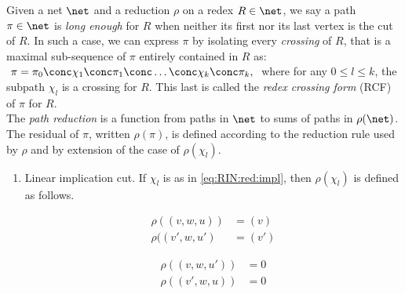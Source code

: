 \begin{definition}
\label{def:RIN:path-red}
Given a net $\net$ and a reduction $\rho$ on a redex $R \in \net$,
we say a path $\pi \in \net$ is \textit{long enough} for $R$ when neither its 
first nor its last vertex is the cut of $R$.
In such a case, we can express $\pi$ by isolating every \textit{crossing} of 
$R$, that is a maximal sub-sequence of $\pi$ entirely contained in $R$ as:
$\ 
  \pi =
  \pi_0 \conc \chi_1 \conc \pi_1 \conc \ldots \conc \chi_k \conc \pi_k\text{,} 
\ $
where for any $0\leq l \leq k$, the subpath $\chi_l$ is a crossing for $R$.
This last is called the \textit{redex crossing form} (RCF) of $\pi$ for $R$.
\\
The \textit{path reduction} is a function from paths in $\net$ to sums 
of paths in $\rho(\net)$.
The residual of $\pi$, written $\rho(\pi)$, is defined according to the 
reduction rule used by $\rho$ and by extension of the case of $\rho(\chi_l)$.
\begin{enumerate}
\item \label{def:RIN:path-red:imp}
  Linear implication cut.
  If $\chi_l$ is as in \autoref{eq:RIN:red:impl},
  then $\rho(\chi_l)$ is defined as follows.\\
  \begin{minipage}{0.45\textwidth}
    \begin{align}
      \label{eq:RIN:crossing-red:imp:ll}
      \rho((v,w,u)) &= (v)\\
    \label{eq:RIN:crossing-red:imp:rr}
    \rho((v',w,u') &= (v')
    \end{align}
  \end{minipage}
  \begin{minipage}{0.45\textwidth}
    \begin{align}
      \label{eq:RIN:crossing-red:imp:lr}
      \rho((v,w,u')) &= 0
      \\
      \label{eq:RIN:crossing-red:imp:rl}
      \rho((v',w,u)) &= 0
    \end{align}
  \end{minipage}\\\vspace{\lineskip}


\end{enumerate}
\end{definition}
